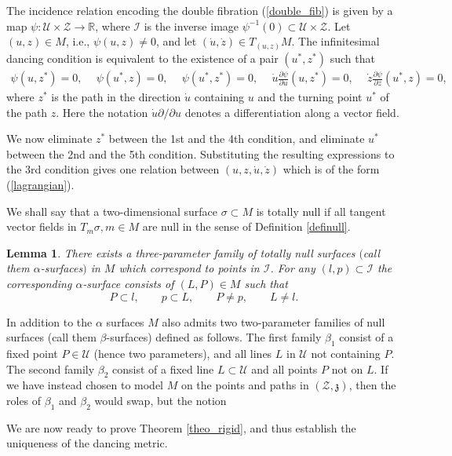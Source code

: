 \documentclass[10pt,a4paper]{article}
\numberwithin{equation}{section}
\newtheorem{Lemma}[Theorem]{Lemma}
\newcommand{\Z}{\mathbb{Z}}
\newcommand{\R}{\mathbb{R}}
\def\p{\partial}
\def\be{\begin{equation}}
\def\z{\mathfrak{z}}
\def\I{\mathcal{I}}
\def\ee{\end{equation}}
\renewcommand{\Z}{\mathcal{Z}}
\newcommand{\U}{\mathcal{U}}
\begin{document}
The incidence relation encoding the double fibration
(\ref{double_fib}) is given by a map $\psi\colon \U\times \Z\rightarrow \R$, where
$\I$ is the inverse image $\psi^{-1}(0)\subset \U\times \Z$.
Let $(u, z)\in M$, i.e., $\psi(u, z)\neq 0$, and let
$(\dot{u}, \dot{z})\in T_{(u, z)} M$. The infinitesimal dancing condition
is equivalent to the existence of a pair $(u^*, z^*)$ such that
\begin{gather*}
\psi(u, z^*)=0, \quad\ \psi(u^*, z)=0, \quad\ \psi (u^*, z^*)=0, \quad\
\dot{u}\frac{\p\psi}{\p u}(u, z^*)=0, \quad\
\dot{z}\frac{\p\psi}{\p z}(u^*, z)=0,
\end{gather*}
where $z^*$ is the path in the direction $\dot{u}$ containing $u$ and
the turning point $u^*$ of the path $z$. Here the notation $\dot{u}\p/\p u$ denotes a differentiation
along a vector field.

We now
eliminate $z^*$ between the 1st and the 4th condition, and eliminate
$u^*$ between the 2nd and the 5th condition. Substituting the resulting
expressions to the 3rd condition gives one relation between
$(u, z, \dot{u}, \dot{z})$ which is of the form (\ref{lagrangian}).

We shall say that a two-dimensional surface $\sigma\subset M$ is totally null
if all tangent vector fields in $T_m\sigma, m\in M$ are null in the sense of
Definition \ref{definull}.

\begin{Lemma}
\label{alpha_s}
There exists a three-parameter family of totally null surfaces
$($call them $\alpha$-surfaces$)$ in $M$ which correspond to points in
${\mathcal I}$. For any $(l, p)\subset {\mathcal I}$ the corresponding
$\alpha$-surface consists of $(L, P)\in M$ such that
\be
\label{alpha_def}
P\subset l, \qquad p\subset L, \qquad P\neq p, \qquad L\neq l.
\ee
\end{Lemma}

In addition to the $\alpha$ surfaces $M$ also admits two two-parameter families
of null surfaces (call them $\beta$-surfaces) defined as follows.
The first family $\beta_1$ consist of a fixed point
$P\in \U$ (hence two parameters), and all lines $L$ in $\U$ not containing $P$. The second family $\beta_2$ consist of a fixed line $L\subset \U$ and all points $P$ not on $L$.
If we have instead chosen to model $M$ on the points and paths in $(\Z, \z)$,
then the roles of $\beta_1$ and $\beta_2$ would swap, but the notion

We are now ready to prove Theorem \ref{theo_rigid}, and thus establish the uniqueness
of the dancing metric.
\end{document}

